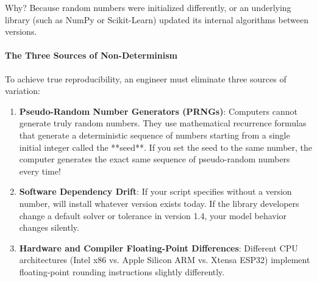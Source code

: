 Why? Because random numbers were initialized differently, or an underlying library (such as NumPy or Scikit-Learn) updated its internal algorithms between versions.

\paragraph{The Three Sources of Non-Determinism}
To achieve true reproducibility, an engineer must eliminate three sources of variation:
\begin{enumerate}
    \item \textbf{Pseudo-Random Number Generators (PRNGs)}:
    Computers cannot generate truly random numbers. They use mathematical recurrence formulas that generate a deterministic sequence of numbers starting from a single initial integer called the **seed**. If you set the seed to the same number, the computer generates the exact same sequence of pseudo-random numbers every time!
    \item \textbf{Software Dependency Drift}:
    If your script specifies  without a version number,  will install whatever version exists today. If the library developers change a default solver or tolerance in version 1.4, your model behavior changes silently.
    \item \textbf{Hardware and Compiler Floating-Point Differences}:
    Different CPU architectures (Intel x86 vs. Apple Silicon ARM vs. Xtensa ESP32) implement floating-point rounding instructions slightly differently.
\end{enumerate}

